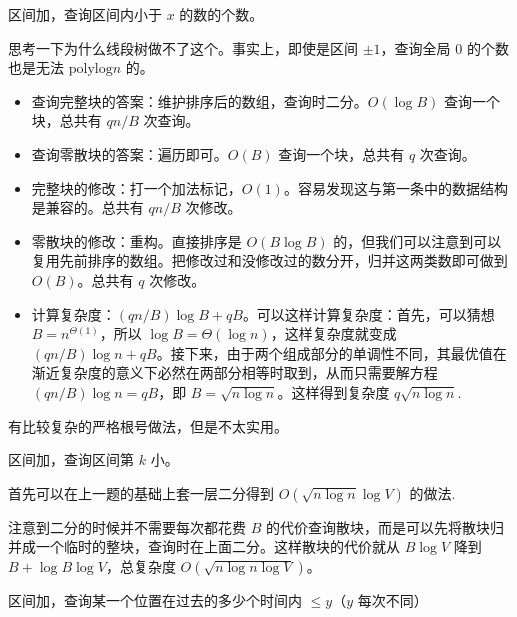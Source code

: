 \begin{example}
    区间加，查询区间内小于 $x$ 的数的个数。
\end{example}
\begin{remark}
    思考一下为什么线段树做不了这个。事实上，即使是区间 $\pm 1$，查询全局 $0$ 的个数也是无法 $\mathrm{polylog} n$ 的。
\end{remark}
\begin{solution}
    \begin{itemize}
        \item 查询完整块的答案：维护排序后的数组，查询时二分。$O(\log B)$ 查询一个块，总共有 $qn/B$ 次查询。
        \item 查询零散块的答案：遍历即可。$O(B)$ 查询一个块，总共有 $q$ 次查询。
        \item 完整块的修改：打一个加法标记，$O(1)$。容易发现这与第一条中的数据结构是兼容的。总共有 $qn/B$ 次修改。
        \item 零散块的修改：重构。直接排序是 $O(B\log B)$ 的，但我们可以注意到可以复用先前排序的数组。把修改过和没修改过的数分开，归并这两类数即可做到 $O(B)$。总共有 $q$ 次修改。
        \item 计算复杂度：$(qn/B)\log B+qB$。可以这样计算复杂度：首先，可以猜想 $B=n^{\Theta(1)}$，所以 $\log B=\Theta(\log n)$，这样复杂度就变成 $(qn/B)\log n+qB$。接下来，由于两个组成部分的单调性不同，其最优值在渐近复杂度的意义下必然在两部分相等时取到，从而只需要解方程 $(qn/B)\log n=qB$，即 $B=\sqrt{n\log n}$。这样得到复杂度 $q\sqrt{n\log n}$.
    \end{itemize} 
\end{solution}
\begin{remark}
    有比较复杂的严格根号做法，但是不太实用。
\end{remark}


\begin{example}[P5356]
    区间加，查询区间第 $k$ 小。
\end{example}
\begin{solution}
    首先可以在上一题的基础上套一层二分得到 $O(\sqrt{n\log n}\log V)$ 的做法.

    注意到二分的时候并不需要每次都花费 $B$ 的代价查询散块，而是可以先将散块归并成一个临时的整块，查询时在上面二分。这样散块的代价就从 $B\log V$ 降到 $B+\log B\log V$，总复杂度 $O(\sqrt{n\log n\log V})$。
\end{solution}

\begin{exercise}[P3863]
    区间加，查询某一个位置在过去的多少个时间内 $\le y$（$y$ 每次不同）
\end{exercise}

